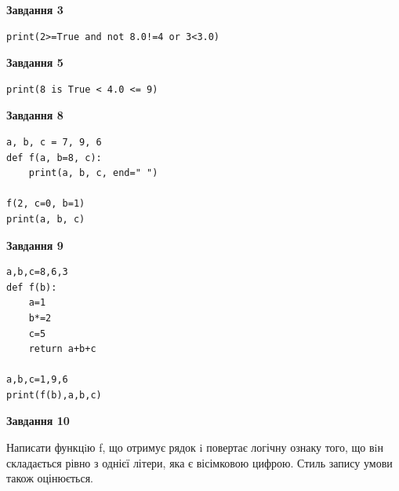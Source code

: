 \documentclass[12pt, ukrainian]{article}
\begin{document}
{\begin {large}
\begin{minipage}[t]{7.5cm}
\end{minipage}
\vline \hspace{6mm}
\begin{minipage}[t]{10.5cm}

\begin{center}
\textbf{Завдання 3}
\end{center}

\begin{verbatim}
print(2>=True and not 8.0!=4 or 3<3.0)
\end{verbatim}



\begin{center}
\textbf{Завдання 5}
\end{center}

\begin{verbatim}
print(8 is True < 4.0 <= 9)
\end{verbatim}



\begin{center}
\textbf{Завдання 8}
\end{center}

\begin{verbatim}
a, b, c = 7, 9, 6
def f(a, b=8, c):
    print(a, b, c, end=" ")

f(2, c=0, b=1)
print(a, b, c)
\end{verbatim}



\begin{center}
\textbf{Завдання 9}
\end{center}

\begin{verbatim}
a,b,c=8,6,3
def f(b):
    a=1
    b*=2
    c=5
    return a+b+c

a,b,c=1,9,6
print(f(b),a,b,c)
\end{verbatim}



\begin{center}
\textbf{Завдання 10}
\end{center}

Написати функцiю f, що отримує рядок i повертає логічну ознаку того, що вiн складається рівно з однієї літери, яка є вісімковою цифрою. Стиль запису умови також оцінюється.\par

\end{minipage}

\end {large}}
\newpage
\end{document}
